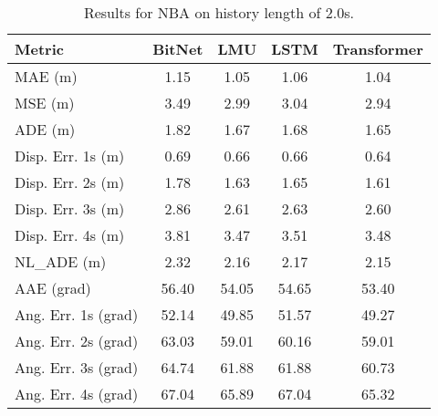 \begin{table}[H]
\centering
\caption{Results for NBA on history length of 2.0s.}
\label{hist:NBA_2.0s}
\begin{tabular}{l||c|c|c|c}
Metric & BitNet & LMU & LSTM & Transformer \\
\hline \hline
MAE (m) & 1.15 & 1.05 & 1.06 & 1.04 \\
MSE (m) & 3.49 & 2.99 & 3.04 & 2.94 \\
ADE (m) & 1.82 & 1.67 & 1.68 & 1.65 \\
Disp. Err. 1s (m) & 0.69 & 0.66 & 0.66 & 0.64 \\
Disp. Err. 2s (m) & 1.78 & 1.63 & 1.65 & 1.61 \\
Disp. Err. 3s (m) & 2.86 & 2.61 & 2.63 & 2.60 \\
Disp. Err. 4s (m) & 3.81 & 3.47 & 3.51 & 3.48 \\
NL\_ADE (m) & 2.32 & 2.16 & 2.17 & 2.15 \\
AAE (grad) & 56.40 & 54.05 & 54.65 & 53.40 \\
Ang. Err. 1s (grad) & 52.14 & 49.85 & 51.57 & 49.27 \\
Ang. Err. 2s (grad) & 63.03 & 59.01 & 60.16 & 59.01 \\
Ang. Err. 3s (grad) & 64.74 & 61.88 & 61.88 & 60.73 \\
Ang. Err. 4s (grad) & 67.04 & 65.89 & 67.04 & 65.32 \\
\end{tabular}
\end{table}
